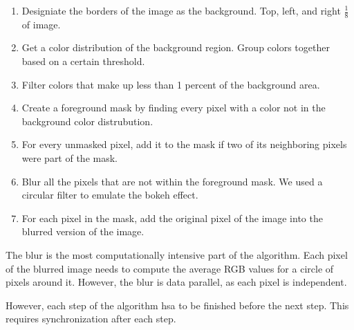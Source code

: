 \documentclass[12pt]{article}
\begin{document}
\begin{enumerate}
    \item
        Designiate the borders of the image as the background. Top, left, and
        right $\tfrac{1}{8}$ of image.
    \item
        Get a color distribution of the background region. Group colors together
        based on a certain threshold.
    \item
        Filter colors that make up less than 1 percent of the background area.
    \item
        Create a foreground mask by finding every pixel with a color not
        in the background color distrubution.
    \item
        For every unmasked pixel, add it to the mask if two of its neighboring
        pixels were part of the mask.
    \item
        Blur all the pixels that are not within the foreground mask. We used a
        circular filter to emulate the bokeh effect.
    \item
        For each pixel in the mask, add the original pixel of the image into
        the blurred version of the image.
\end{enumerate}

The blur is the most computationally intensive part of the algorithm. Each pixel
of the blurred image needs to compute the average RGB values for a circle
of pixels around it. However, the blur is data parallel, as each pixel is
independent.

However, each step of the algorithm hsa to be finished before the next step.
This requires synchronization after each step.
\end{document}
